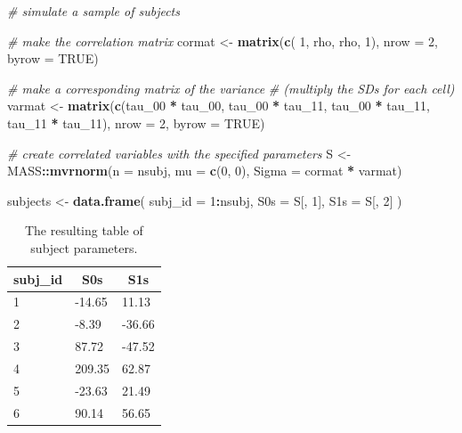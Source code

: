 \documentclass[doc,floatsintext]{apa6}
\newenvironment{Shaded}{\begin{snugshade}}{\end{snugshade}}
\newcommand{\KeywordTok}[1]{\textcolor[rgb]{0.13,0.29,0.53}{\textbf{#1}}}
\newcommand{\DataTypeTok}[1]{\textcolor[rgb]{0.13,0.29,0.53}{#1}}
\newcommand{\DecValTok}[1]{\textcolor[rgb]{0.00,0.00,0.81}{#1}}
\newcommand{\StringTok}[1]{\textcolor[rgb]{0.31,0.60,0.02}{#1}}
\newcommand{\CommentTok}[1]{\textcolor[rgb]{0.56,0.35,0.01}{\textit{#1}}}
\newcommand{\OtherTok}[1]{\textcolor[rgb]{0.56,0.35,0.01}{#1}}
\newcommand{\OperatorTok}[1]{\textcolor[rgb]{0.81,0.36,0.00}{\textbf{#1}}}
\newcommand{\NormalTok}[1]{#1}
\begin{document}
\begin{Shaded}
\begin{Highlighting}[]
\CommentTok{# simulate a sample of subjects}

\CommentTok{# make the correlation matrix}
\NormalTok{cormat <-}\StringTok{ }\KeywordTok{matrix}\NormalTok{(}\KeywordTok{c}\NormalTok{(   }\DecValTok{1}\NormalTok{, rho,}
\NormalTok{                   rho,    }\DecValTok{1}\NormalTok{), }
             \DataTypeTok{nrow =} \DecValTok{2}\NormalTok{, }\DataTypeTok{byrow =} \OtherTok{TRUE}\NormalTok{) }

\CommentTok{# make a corresponding matrix of the variance }
\CommentTok{# (multiply the SDs for each cell)}
\NormalTok{varmat <-}\StringTok{ }\KeywordTok{matrix}\NormalTok{(}\KeywordTok{c}\NormalTok{(tau_}\DecValTok{00} \OperatorTok{*}\StringTok{ }\NormalTok{tau_}\DecValTok{00}\NormalTok{, tau_}\DecValTok{00} \OperatorTok{*}\StringTok{ }\NormalTok{tau_}\DecValTok{11}\NormalTok{,}
\NormalTok{                  tau_}\DecValTok{00} \OperatorTok{*}\StringTok{ }\NormalTok{tau_}\DecValTok{11}\NormalTok{, tau_}\DecValTok{11} \OperatorTok{*}\StringTok{ }\NormalTok{tau_}\DecValTok{11}\NormalTok{), }
             \DataTypeTok{nrow =} \DecValTok{2}\NormalTok{, }\DataTypeTok{byrow =} \OtherTok{TRUE}\NormalTok{) }

\CommentTok{# create correlated variables with the specified parameters}
\NormalTok{S <-}\StringTok{ }\NormalTok{MASS}\OperatorTok{::}\KeywordTok{mvrnorm}\NormalTok{(}\DataTypeTok{n =}\NormalTok{ nsubj, }\DataTypeTok{mu =} \KeywordTok{c}\NormalTok{(}\DecValTok{0}\NormalTok{, }\DecValTok{0}\NormalTok{), }\DataTypeTok{Sigma =}\NormalTok{ cormat }\OperatorTok{*}\StringTok{ }\NormalTok{varmat)}

\NormalTok{subjects <-}\StringTok{ }\KeywordTok{data.frame}\NormalTok{(}
  \DataTypeTok{subj_id =} \DecValTok{1}\OperatorTok{:}\NormalTok{nsubj,}
  \DataTypeTok{S0s =}\NormalTok{ S[, }\DecValTok{1}\NormalTok{],}
  \DataTypeTok{S1s =}\NormalTok{ S[, }\DecValTok{2}\NormalTok{]}
\NormalTok{)}
\end{Highlighting}
\end{Shaded}

\begin{table}[H]
\begin{center}
\begin{threeparttable}
\caption{\label{tab:subj-table}The resulting table of subject parameters.}
\begin{tabular}{lll}
\toprule
subj\_id & \multicolumn{1}{c}{S0s} & \multicolumn{1}{c}{S1s}\\
\midrule
1 & -14.65 & 11.13\\
2 & -8.39 & -36.66\\
3 & 87.72 & -47.52\\
4 & 209.35 & 62.87\\
5 & -23.63 & 21.49\\
6 & 90.14 & 56.65\\
\bottomrule
\end{tabular}
\end{threeparttable}
\end{center}
\end{table}
\end{document}
